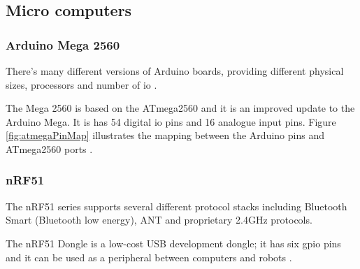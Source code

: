 \subsection{Micro computers}
\subsubsection{Arduino Mega 2560}
There's many different versions of Arduino boards, providing different physical sizes, processors and number of \acrfull{io} \cite{arduinoboards}. 

The Mega 2560 is based on the ATmega2560 and it is an improved update to the Arduino Mega. It is has 54 digital \acrshort{io} pins and 16 analogue input pins. Figure \ref{fig:atmegaPinMap} illustrates the mapping between the Arduino pins and ATmega2560 ports \cite{arduinomega2560}. 



\subsubsection{nRF51}
The nRF51 series supports several different protocol stacks including Bluetooth Smart (Bluetooth low energy), ANT and proprietary 2.4GHz protocols. 

The nRF51 Dongle is a low-cost USB development dongle; it has six \acrfull{gpio} pins and it can be used as a peripheral between computers and robots \cite{nrf51Dongle}.


